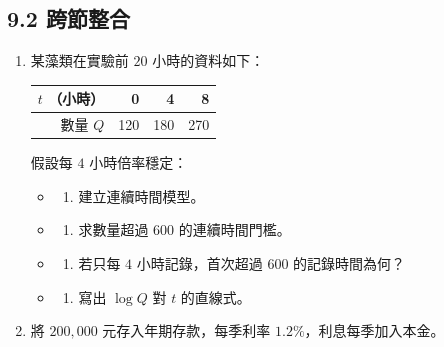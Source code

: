 \documentclass[11pt,a4paper]{article}
\newcounter{none}
\providecommand{\tightlist}{%
  \setlength{\itemsep}{0pt}\setlength{\parskip}{0pt}}
\begin{document}
\subsection{9.2 跨節整合}\label{ux8de8ux7bc0ux6574ux5408}

\begin{enumerate}
\def\labelenumi{\arabic{enumi}.}
\setcounter{enumi}{12}
\item
  某藻類在實驗前 \(20\) 小時的資料如下：

  {\def\LTcaptype{none} %
  \begin{longtable}[]{@{}rrrr@{}}
  \toprule\noalign{}
  \(t\) （小時） & 0 & 4 & 8 \\
  \midrule\noalign{}
  \endhead
  \bottomrule\noalign{}
  \endlastfoot
  數量 \(Q\) & 120 & 180 & 270 \\
  \end{longtable}
  }

  假設每 \(4\) 小時倍率穩定：

  \begin{itemize}
  \tightlist
  \item
    \begin{enumerate}
    \def\labelenumii{(\alph{enumii})}
    \tightlist
    \item
      建立連續時間模型。
    \end{enumerate}
  \item
    \begin{enumerate}
    \def\labelenumii{(\alph{enumii})}
    \setcounter{enumii}{1}
    \tightlist
    \item
      求數量超過 \(600\) 的連續時間門檻。
    \end{enumerate}
  \item
    \begin{enumerate}
    \def\labelenumii{(\alph{enumii})}
    \setcounter{enumii}{2}
    \tightlist
    \item
      若只每 \(4\) 小時記錄，首次超過 \(600\) 的記錄時間為何？
    \end{enumerate}
  \item
    \begin{enumerate}
    \def\labelenumii{(\alph{enumii})}
    \setcounter{enumii}{3}
    \tightlist
    \item
      寫出 \(\log Q\) 對 \(t\) 的直線式。
    \end{enumerate}
  \end{itemize}
\item
  將 \(200{,}000\) 元存入年期存款，每季利率 \(1.2\%\)，利息每季加入本金。


\end{enumerate}
\end{document}
